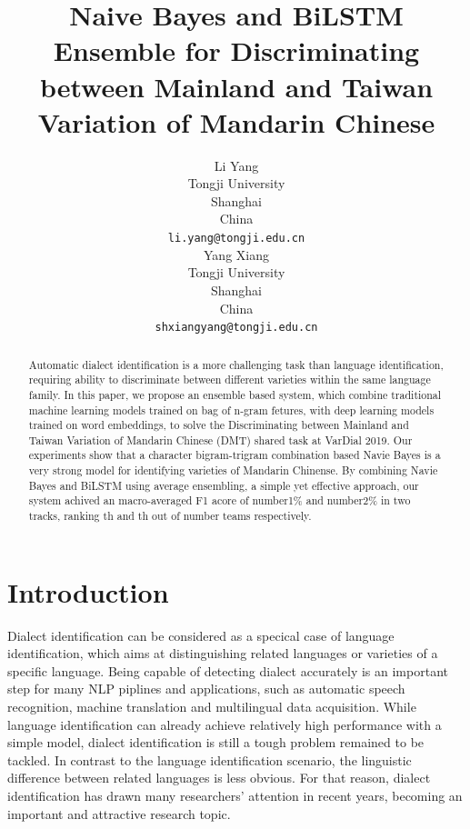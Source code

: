 \documentclass[11pt,a4paper]{article}
\title{Naive Bayes and BiLSTM Ensemble for Discriminating between Mainland and Taiwan Variation of Mandarin Chinese}
\author{Li Yang \\
  Tongji University \\
  Shanghai \\
  China \\
  {\tt li.yang@tongji.edu.cn} \\\And
  Yang Xiang \\
  Tongji University \\
  Shanghai \\
  China \\
  {\tt shxiangyang@tongji.edu.cn} \\}
\date{}
\begin{document}
\maketitle
\begin{abstract}
  Automatic dialect identification is a more challenging task than language identification, requiring ability to discriminate between different varieties within the same language family. In this paper, we propose an ensemble based system, which combine traditional machine learning models trained on bag of n-gram fetures, with deep learning models trained on word embeddings, to solve the Discriminating between Mainland and Taiwan Variation of Mandarin Chinese (DMT) shared task at VarDial 2019. Our experiments show that a character bigram-trigram combination based Navie Bayes is a very strong model for identifying varieties of Mandarin Chinense. By combining Navie Bayes and BiLSTM using average ensembling, a simple yet effective approach, our system achived an macro-averaged F1 acore of number1\% and number2\% in two tracks, ranking th and th out of number teams respectively.
\end{abstract}

\section{Introduction\label{introduction}}

Dialect identification can be considered as a specical case of language identification, which aims at distinguishing  related languages or varieties of a specific language. Being capable of detecting dialect accurately is an important step for many NLP piplines and applications, such as automatic speech recognition, machine translation and multilingual data acquisition. While language identification can already achieve relatively high performance with a simple model, dialect identification is still a tough problem remained to be tackled. In contrast to the language identification scenario, the linguistic difference between related languages is less obvious. For that reason, dialect identification has drawn many researchers' attention in recent years, becoming an important and attractive research topic.
\end{document}
